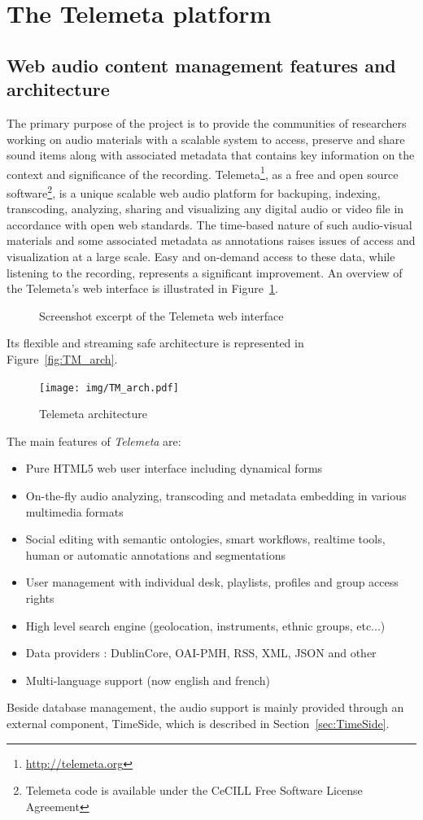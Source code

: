 \documentclass{sig-alternate}
\begin{document}
 
 \section{The Telemeta platform}\label{sec:Telemeta}
 \subsection{Web audio content management features and architecture}
The primary purpose of the project is to provide the communities of researchers working on audio materials with a scalable system to access, preserve and share sound items along with associated metadata that contains key information on the context and significance of the recording.
Telemeta\footnote{\url{http://telemeta.org}}, as a free and open source software\footnote{Telemeta code is available under the CeCILL Free Software License Agreement}, is a unique scalable web audio platform for backuping, indexing, transcoding, analyzing, sharing and visualizing any digital audio or video file in accordance with open web standards.
The time-based nature of such audio-visual materials and some associated metadata as annotations raises issues of access and visualization at a large scale. Easy and on-demand access to these data, while listening to the recording, represents a significant improvement.
An overview of the Telemeta's web interface is illustrated in Figure~\ref{fig:Telemeta}.
\begin{figure}[htb]
   \centering
   \caption[1]{Screenshot excerpt of the Telemeta web interface}
    \label{fig:Telemeta}
 \end{figure}
Its flexible and streaming safe architecture is represented in Figure~\ref{fig:TM_arch}.
\begin{figure}[htbp]
  \centering
  \texttt{[image: img/TM\_arch.pdf]}
  \caption{Telemeta architecture}\label{fig:TM_arch}
  \label{fig:screenshot}
\end{figure}
The main features of \emph{Telemeta} are:
      \begin{itemize}
      \item Pure HTML5 web user interface including dynamical forms
      \item On-the-fly audio analyzing, transcoding and metadata
        embedding in various multimedia formats
      \item Social editing with semantic ontologies, smart workflows,
        realtime tools, human or automatic annotations and
        segmentations
      \item User management with individual desk, playlists, profiles
        and group access rights
      \item High level search engine (geolocation, instruments, ethnic groups, etc...)
      \item Data providers : DublinCore, OAI-PMH, RSS, XML, JSON and other 
      \item Multi-language support (now english and french)
      \end{itemize}
Beside database management, the audio support is mainly provided through an external component, TimeSide, which is described in Section~\ref{sec:TimeSide}.
\end{document}
